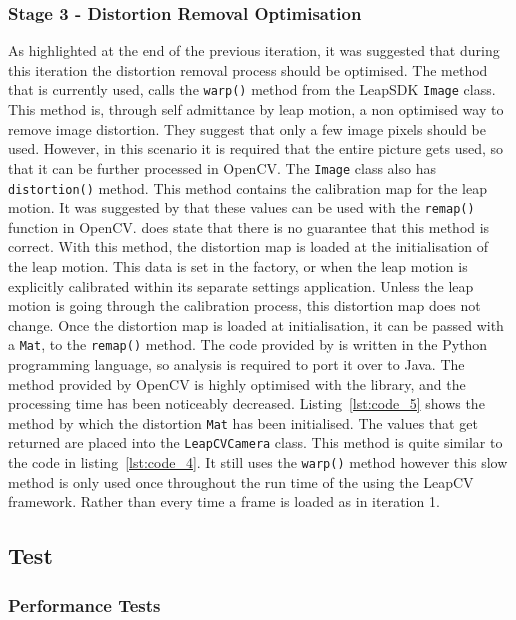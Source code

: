 \documentclass[11pt,oneside]{report}
\newcommand\code[1]{\texttt{#1}}
\begin{document}
		\subsubsection{Stage 3 - Distortion Removal Optimisation}
			As highlighted at the end of the previous iteration, it was suggested that during this iteration the distortion removal process should be optimised.
			The method that is currently used, calls the \code{warp()} method from the LeapSDK \code{Image} class.
			This method is, through self admittance by leap motion, a non optimised way to remove image distortion.
			They suggest that only a few image pixels should be used.
			However, in this scenario it is required that the entire picture gets used, so that it can be further processed in OpenCV.
			The \code{Image} class also has \code{distortion()} method.
			This method contains the calibration map for the leap motion.
			It was suggested by  that these values can be used with the \code{remap()} function in OpenCV.
			 does state that there is no guarantee that this method is correct.
			With this method, the distortion map is loaded at the initialisation of the leap motion.
			This data is set in the factory, or when the leap motion is explicitly calibrated within its separate settings application.
			Unless the leap motion is going through the calibration process, this distortion map does not change.
			Once the distortion map is loaded at initialisation, it can be passed with a \code{Mat}, to the \code{remap()} method.
			The code provided by  is written in the Python programming language, so analysis is required to port it over to Java.
			The method provided by OpenCV is highly optimised with the library, and the processing time has been noticeably decreased.
			Listing~\ref{lst:code_5} shows the method by which the distortion \code{Mat} has been initialised.
			The values that get returned are placed into the \code{LeapCVCamera} class.
			This method is quite similar to the code in listing~\ref{lst:code_4}.
			It still uses the \code{warp()} method however this slow method is only used once throughout the run time of the using the LeapCV framework.
			Rather than every time a frame is loaded as in iteration 1.
			
		\subsection{Test}
			\subsubsection{Performance Tests}
			
			
\end{document}
